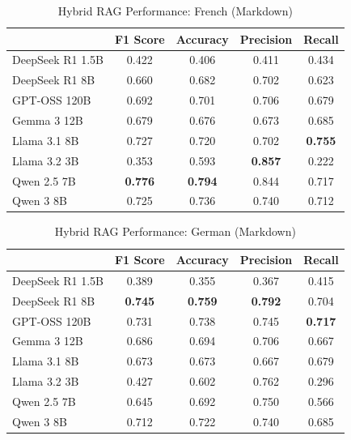 \begin{table}[!htbp]
\caption{Hybrid RAG Performance: French (Markdown)}
\label{tab:hybrid_french_md}
\begin{tabular}{lcccc}
\toprule
 & F1 Score & Accuracy & Precision & Recall \\
\midrule
DeepSeek R1 1.5B & 0.422 & 0.406 & 0.411 & 0.434 \\
DeepSeek R1 8B & 0.660 & 0.682 & 0.702 & 0.623 \\
GPT-OSS 120B & 0.692 & 0.701 & 0.706 & 0.679 \\
Gemma 3 12B & 0.679 & 0.676 & 0.673 & 0.685 \\
Llama 3.1 8B & 0.727 & 0.720 & 0.702 & \textbf{0.755} \\
Llama 3.2 3B & 0.353 & 0.593 & \textbf{0.857} & 0.222 \\
Qwen 2.5 7B & \textbf{0.776} & \textbf{0.794} & 0.844 & 0.717 \\
Qwen 3 8B & 0.725 & 0.736 & 0.740 & 0.712 \\
\bottomrule
\end{tabular}
\end{table}


\begin{table}[!htbp]
\caption{Hybrid RAG Performance: German (Markdown)}
\label{tab:hybrid_german_md}
\begin{tabular}{lcccc}
\toprule
 & F1 Score & Accuracy & Precision & Recall \\
\midrule
DeepSeek R1 1.5B & 0.389 & 0.355 & 0.367 & 0.415 \\
DeepSeek R1 8B & \textbf{0.745} & \textbf{0.759} & \textbf{0.792} & 0.704 \\
GPT-OSS 120B & 0.731 & 0.738 & 0.745 & \textbf{0.717} \\
Gemma 3 12B & 0.686 & 0.694 & 0.706 & 0.667 \\
Llama 3.1 8B & 0.673 & 0.673 & 0.667 & 0.679 \\
Llama 3.2 3B & 0.427 & 0.602 & 0.762 & 0.296 \\
Qwen 2.5 7B & 0.645 & 0.692 & 0.750 & 0.566 \\
Qwen 3 8B & 0.712 & 0.722 & 0.740 & 0.685 \\
\bottomrule
\end{tabular}
\end{table}


